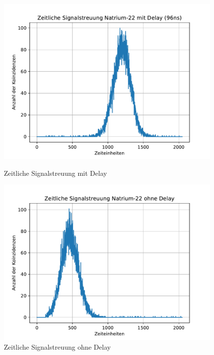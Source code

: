 \documentclass[11pt]{scrartcl}
\begin{document}
\begin{figure}[htbp] 
	\begin{minipage}[t]{0.45\linewidth} 
     \includegraphics[width=1.2\textwidth]{Zeitliche_Signalstreuung_Natrium-22_mit_Delay_(96ns).pdf}
  \caption{Zeitliche Signalstreuung mit Delay}
  \label{mitDelay}
\end{minipage}
\hfill
\begin{minipage}[t]{0.45\linewidth}  
     \includegraphics[width=1.2\textwidth]{Zeitliche_Signalstreuung_Natrium-22_ohne_Delay.pdf}
  \caption{Zeitliche Signalstreuung ohne Delay}
  \label{ohneDelay}
\end{minipage}
\end{figure}
\end{document}
